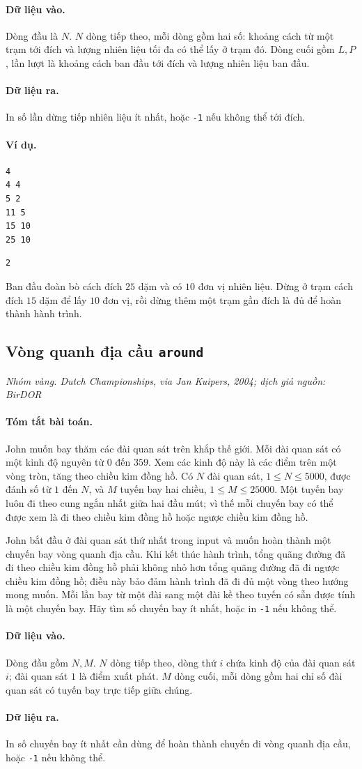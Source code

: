 \documentclass[11pt]{article}
\newcommand{\problem}[4]{%
  \subsection[#1 (#2)]{#1 \hfill {\normalsize\texttt{#2}}}%
  \noindent\textit{#3. #4}\par\smallskip
}
\newcommand{\iosec}[1]{\paragraph{#1}}
\begin{document}
\iosec{Dữ liệu vào.}
Dòng đầu là \(N\). \(N\) dòng tiếp theo, mỗi dòng gồm hai số: khoảng cách từ
một trạm tới đích và lượng nhiên liệu tối đa có thể lấy ở trạm đó. Dòng cuối
gồm \(L,P\), lần lượt là khoảng cách ban đầu tới đích và lượng nhiên liệu ban
đầu.

\iosec{Dữ liệu ra.}
In số lần dừng tiếp nhiên liệu ít nhất, hoặc \texttt{-1} nếu không thể tới
đích.

\iosec{Ví dụ.}
\begin{verbatim}
4
4 4
5 2
11 5
15 10
25 10
\end{verbatim}

\begin{verbatim}
2
\end{verbatim}

Ban đầu đoàn bò cách đích \(25\) dặm và có \(10\) đơn vị nhiên liệu. Dừng ở
trạm cách đích \(15\) dặm để lấy \(10\) đơn vị, rồi dừng thêm một trạm gần
đích là đủ để hoàn thành hành trình.

\problem{Vòng quanh địa cầu}{around}{Nhóm vàng}{Dutch Championships, via Jan Kuipers, 2004; dịch giả nguồn: BirDOR}

\iosec{Tóm tắt bài toán.}
John muốn bay thăm các đài quan sát trên khắp thế giới. Mỗi đài quan sát có
một kinh độ nguyên từ \(0\) đến \(359\). Xem các kinh độ này là các điểm trên
một vòng tròn, tăng theo chiều kim đồng hồ. Có \(N\) đài quan sát,
\(1\le N\le 5000\), được đánh số từ \(1\) đến \(N\), và \(M\) tuyến bay hai
chiều, \(1\le M\le 25000\). Một tuyến bay luôn đi theo cung ngắn nhất giữa hai
đầu mút; vì thế mỗi chuyến bay có thể được xem là đi theo chiều kim đồng hồ
hoặc ngược chiều kim đồng hồ.

John bắt đầu ở đài quan sát thứ nhất trong input và muốn hoàn thành một
chuyến bay vòng quanh địa cầu. Khi kết thúc hành trình, tổng quãng đường đã
đi theo chiều kim đồng hồ phải không nhỏ hơn tổng quãng đường đã đi ngược
chiều kim đồng hồ; điều này bảo đảm hành trình đã đi đủ một vòng theo hướng
mong muốn. Mỗi lần bay từ một đài sang một đài kề theo tuyến có sẵn được tính
là một chuyến bay. Hãy tìm số chuyến bay ít nhất, hoặc in \texttt{-1} nếu
không thể.

\iosec{Dữ liệu vào.}
Dòng đầu gồm \(N,M\). \(N\) dòng tiếp theo, dòng thứ \(i\) chứa kinh độ của
đài quan sát \(i\); đài quan sát \(1\) là điểm xuất phát. \(M\) dòng cuối,
mỗi dòng gồm hai chỉ số đài quan sát có tuyến bay trực tiếp giữa chúng.

\iosec{Dữ liệu ra.}
In số chuyến bay ít nhất cần dùng để hoàn thành chuyến đi vòng quanh địa cầu,
hoặc \texttt{-1} nếu không thể.
\end{document}
